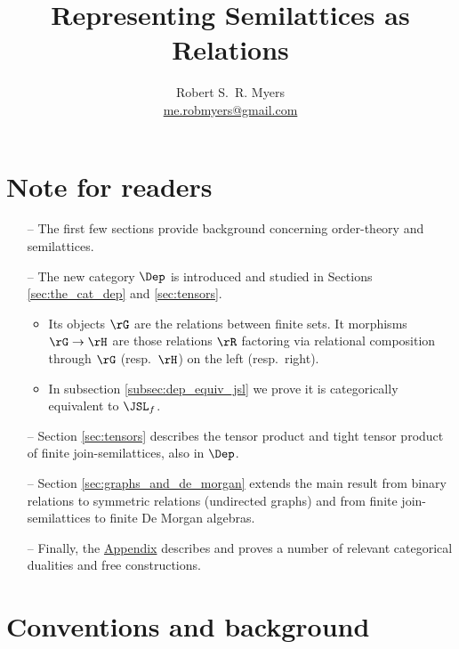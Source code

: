 \documentclass{article}
\begin{document}
\title{Representing Semilattices as Relations}
\author{Robert S.\ R. Myers  \\[1ex] \href{me.robmyers@gmail.com}{me.robmyers@gmail.com} }
\maketitle

\CompileMatrices

\section{Note for readers}

\begin{itemize}
  \item[--]
  The first few sections provide background concerning order-theory and semilattices.
  \item[--] 
  The new category $\Dep$ is introduced and studied in Sections \ref{sec:the_cat_dep} and \ref{sec:tensors}.
  \begin{itemize}
    \item 
    Its objects $\rG$ are the relations between finite sets.
    It morphisms $\rG \to \rH$ are those relations $\rR$ factoring via relational composition through $\rG$ (resp.\ $\rH$) on the left (resp.\ right).
    \item
    In subsection \ref{subsec:dep_equiv_jsl} we prove it is categorically equivalent to $\JSL_f$.
  \end{itemize}
  \item[--]
  Section \ref{sec:tensors} describes the tensor product and tight tensor product of finite join-semilattices, also in $\Dep$.
  \item[--]
  Section \ref{sec:graphs_and_de_morgan} extends the main result from binary relations to symmetric relations (undirected graphs) and from finite join-semilattices to finite De Morgan algebras.
  \item[--]
  Finally, the \hyperref[appendix:appendix]{Appendix} describes and proves a number of relevant categorical dualities and free constructions.
\end{itemize}



\section{Conventions and background}
\end{document}
